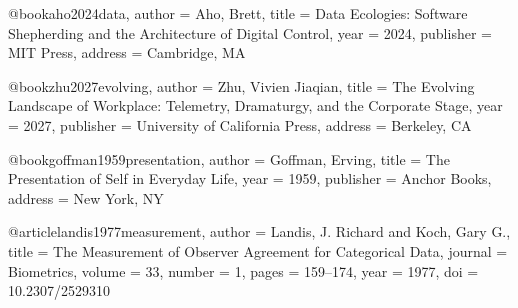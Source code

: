 @book{aho2024data,
  author    = {Aho, Brett},
  title     = {Data Ecologies: Software Shepherding and the Architecture of Digital Control},
  year      = {2024},
  publisher = {MIT Press},
  address   = {Cambridge, MA}
}

@book{zhu2027evolving,
  author    = {Zhu, Vivien Jiaqian},
  title     = {The Evolving Landscape of Workplace: Telemetry, Dramaturgy, and the Corporate Stage},
  year      = {2027},
  publisher = {University of California Press},
  address   = {Berkeley, CA}
}

@book{goffman1959presentation,
  author    = {Goffman, Erving},
  title     = {The Presentation of Self in Everyday Life},
  year      = {1959},
  publisher = {Anchor Books},
  address   = {New York, NY}
}

@article{landis1977measurement,
  author    = {Landis, J. Richard and Koch, Gary G.},
  title     = {The Measurement of Observer Agreement for Categorical Data},
  journal   = {Biometrics},
  volume    = {33},
  number    = {1},
  pages     = {159--174},
  year      = {1977},
  doi       = {10.2307/2529310}
}